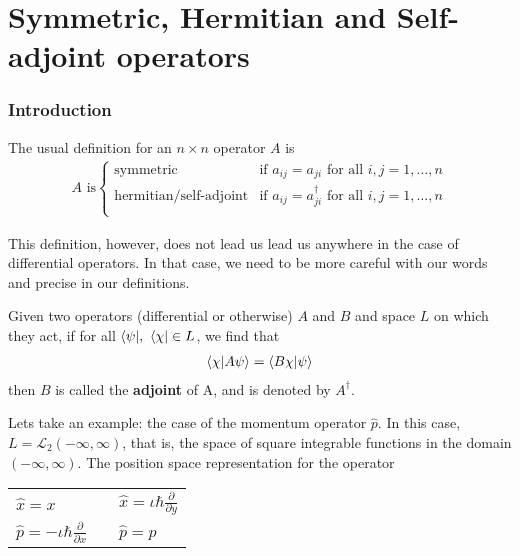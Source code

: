 \chapter{Symmetric, Hermitian and Self-adjoint operators}

\subsection*{Introduction}

The usual definition for an $n \times n$  operator $A$ is
\begin{align*}
    A \text{ is}
    \begin{cases}
        \text{symmetric } &\text{if } a_{ij} = a_{ji} \text{ for all } i,j = 1,\dotsc,n \\[1em]
        \text{hermitian/self-adjoint} &\text{if } a_{ij} = a_{ji}^\dagger \text{ for all } i,j = 1,\dotsc,n \\
    \end{cases}
\end{align*}

This definition, however, does not lead us lead us anywhere in the case of differential operators. In that case, we need to be more careful with our words and precise in our definitions.

\begin{definition}
    Given two operators (differential or otherwise) $A$ and $B$ and space $L$ on which they act, if for all $\bra \psi,\ \bra \chi \in L$, we find that
    \begin{align*}
        \langle \chi | A \psi \rangle =  \langle B \chi | \psi\rangle
    \end{align*}
then $B$ is called the \textbf{adjoint} of A, and is denoted by $A^\dagger$.
\end{definition}

Lets take an example: the case of the momentum operator $\hat p$. In this case, $L = \mathcal L_2(-\infty, \infty)$, that is, the space of square integrable functions in the domain $(-\infty, \infty)$. The position space representation for the operator 
\begin{center}
\begin{tabular}{l|l}
    $\hat{x} = x\quad$ & $\quad\hat x = \iota \hbar \frac{\partial }{\partial y}$\\
    $\hat p = -\iota \hbar \frac{\partial }{\partial x}$ & $\quad\hat{p} = p$ \\
\end{tabular}
\end{center}

